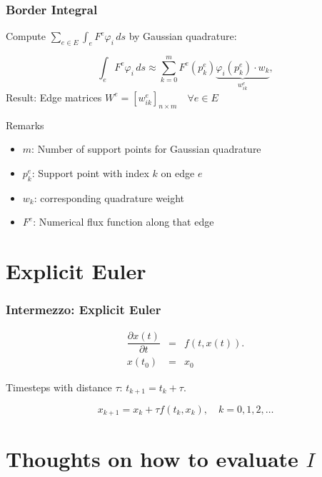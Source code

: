 \documentclass{beamer}
\newcommand{\pd}[2]{\dfrac{\partial #1}{\partial #2}}
\renewcommand{\phi}{\varphi}
\begin{document}
\begin{frame}
  \frametitle{Border Integral}
  Compute $\sum_{e \in E} \int_{e} F^e \phi_i \, ds$ by Gaussian quadrature:

  \begin{equation}
    \int_{e} F^e \phi_i \, ds \approx \sum_{k=0}^{m} F^e(p_k^e) \underbrace{\phi_i(p_k^e) \cdot w_k}_{w_{ik}^e},
  \end{equation}
  Result: Edge matrices $W^e = [w_{ik}^e]_{n \times m} \quad \forall e \in E$
  \begin{block}{Remarks}
    \begin{itemize}
    \item $m$: Number of support points for Gaussian quadrature
    \item $p_k^e$: Support point with index $k$ on edge $e$
    \item $w_k$: corresponding quadrature weight
    \item $F^e$: Numerical flux function along that edge
    \end{itemize}
  \end{block}
\end{frame}

\section{Explicit Euler}
\label{sec:appendix-explicit-euler}

\begin{frame}
  \frametitle{Intermezzo: Explicit Euler}
  \begin{eqnarray}
    \label{eq:euler-method-setting}
    \pd{x(t)}{t} &=& f(t, x(t)). \\
    x(t_0) &=& x_0
  \end{eqnarray}
  
  Timesteps with distance $\tau$: $t_{k+1} = t_k + \tau$.
  
  \begin{equation}
    \label{eq:euler-step-solution}
    x_{k+1} = x_k + \tau f(t_k, x_k), \quad k=0,1,2,\dots
  \end{equation}
  
\end{frame}


\section{Thoughts on how to evaluate $I$}
\label{sec:appendix-evaluate-I}
\end{document}
